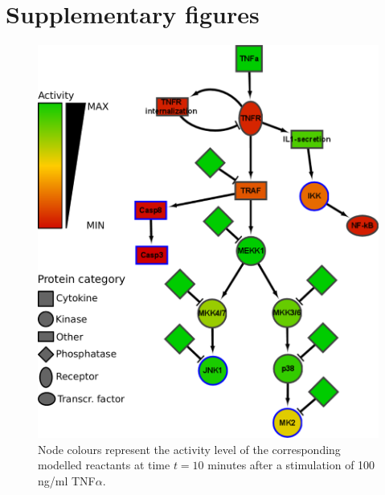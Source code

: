 \documentclass{bmcart}
\begin{document}
%
%
%
%





\clearpage

\section{Supplementary figures}\label{sec:supplementary-figures}


\begin{figure}[htpb]
\begin{minipage}{\textwidth}
\centering
  \includegraphics[width=.7\textwidth]{Figures/S7}
\caption{ Node colours represent the activity level of the
corresponding modelled reactants at time $t = 10$ minutes after a stimulation of 100 ng/ml TNF$\alpha$.}\label{fig:large-model-tnf}
\end{minipage}
\end{figure}
\end{document}
